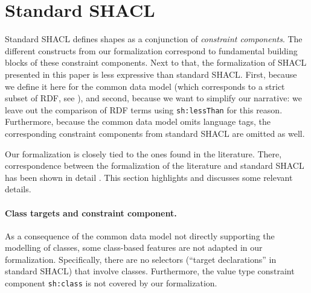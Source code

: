 
\section{Standard SHACL}

\label{app:standard-shacl}

Standard SHACL defines shapes as a conjunction of \emph{constraint components}. The different constructs from our formalization correspond to fundamental building blocks of these constraint components. Next to that, the formalization of SHACL presented in this paper is less expressive than standard SHACL. First, because we define it here for the common data model (which corresponds to a strict subset of RDF, see ), and second, because we want to simplify our narrative: we leave out the comparison of RDF terms using \texttt{sh:lessThan} for this reason. Furthermore, because the common data model omits language tags, the corresponding constraint components from standard SHACL are omitted as well.

Our formalization is closely tied to the ones found in the literature. There, correspondence between the formalization of the literature and standard SHACL has been shown in detail \cite{MJPHD}. This section highlights and discusses some relevant details.

\paragraph{Class targets and constraint component.} As a consequence of the common data model not directly supporting the modelling of classes, some class-based features are not adapted in our formalization. Specifically, there are no selectors (``target declarations'' in standard SHACL) that involve classes. Furthermore, the value type constraint component \texttt{sh:class} is not covered by our formalization.


